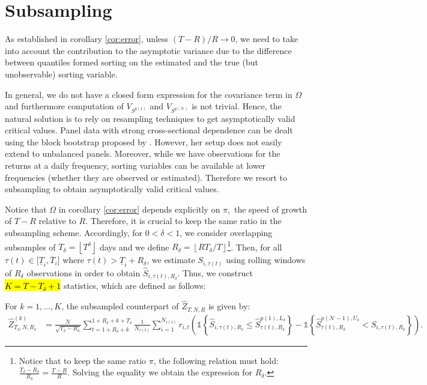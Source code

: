 
\section{Subsampling}
\label{Subsampling}

As established in corollary \ref{cor:error}, unless $(T-R)/R\rightarrow 0$, we need to take into account the contribution to the asymptotic variance due to the difference between quantiles formed sorting on the estimated and the true (but unobservable) sorting variable. 

In general, we do not have a closed form expression for the covariance term in $\Omega$ and furthermore computation of $V_{S^{q(1)}}$ and $V_{S^{q(\mathcal{N})}}$ is not trivial. Hence, the natural solution is to rely on resampling techniques to get asymptotically valid critical values. Panel data with strong cross-sectional dependence can be dealt using the block bootstrap proposed by \cite{gonccalves2011moving}. However, her setup does not easily extend to unbalanced panels. Moreover, while we have observations for the returns at a daily frequency, sorting variables can be available at lower frequencies (whether they are observed or estimated). Therefore we resort to subsampling to obtain asymptotically valid critical values.

Notice that $\Omega$ in corollary \ref{cor:error} depends explicitly on $\pi,$ the speed of growth of $T-R$ relative to $R$. Therefore, it is crucial to keep the same ratio in the subsampling scheme. Accordingly, for $0<\delta<1$, we consider overlapping subsamples of $T_{\delta}=\left\lfloor T^{\delta}\right\rfloor$ days and we define $R_\delta = \left\lfloor R T_\delta / T \right\rfloor$\footnote{Notice that to keep the same ratio $\pi$, the following relation must hold: $\frac{T_\delta - R_\delta}{R_\delta} = \frac{T - R}{R}$. Solving the equality we obtain the expression for $R_\delta$.}. Then, for all $\tau(t) \in \lbrack \underline{T}_{i},\overline{T}_{i} \rbrack$ where $\tau(t) >\underline{T}_{i}+R_\delta$, we estimate $S_{i,\tau(t)}$ using rolling windows of $R_\delta$ observations in order to obtain $\widehat{S}_{i,\tau(t),R_\delta}$. Thus, we construct \hl{$K=T-T_\delta+1$} statistics, which are defined as follows: 

\begin{definition}
For $k=1,\ldots,K$, the subsampled counterpart of $\widehat{Z}_{T,N,R}$ is given by:
\begin{align*}
    \widehat{Z}_{T_\delta,N,R_\delta}^{(k)} &= \frac{\mathcal{N}}{\sqrt{T_\delta - R_\delta}} \sum_{t=1+R_\delta+k}^{1+R_\delta+k+T_\delta}\frac{1}{N_{\tau(t)}}\sum_{i=1}^{N_{\tau(t)}}r_{i,t}\left( \mathds{1}\left\{ \widehat{S}_{i,\tau(t),R_\delta}\leq \widehat{S}_{\tau(t) ,R_\delta}^{p(1), L_\delta}\right\} - \mathds{1}\left\{ \widehat{S}_{\tau(t), R_\delta}^{p(\mathcal{N}-1), U_\delta} < \widehat{S}_{i,\tau(t), R_\delta} \right\} \right). 
\end{align*}
\end{definition}

